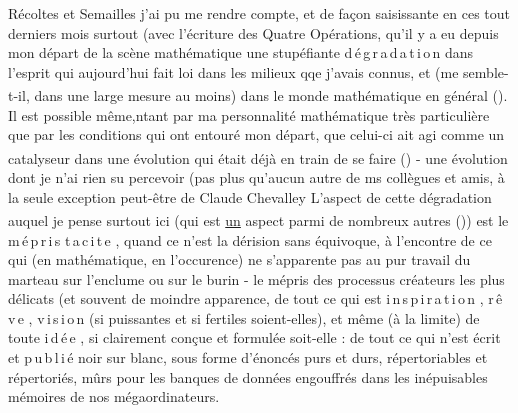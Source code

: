 Récoltes et Semailles j'ai pu me rendre compte, et de façon saisissante en ces tout derniers mois surtout (avec l'écriture des Quatre Opérations\handwritten{)}, qu'il y a eu depuis mon départ de la scène mathématique une stupéfiante \mbox{d\,é\,g\,r\,a\,d\,a\,t\,i\,o\,n} dans l'esprit qui aujourd'hui fait loi dans les milieux qqe j'avais connus, et (me semble-t-il, dans une large mesure au moins) dans le monde mathématique en général (\textsuperscript{}). Il est possible même,ntant par ma personnalité mathématique très particulière que par les conditions qui ont entouré mon départ, que celui-ci ait agi comme un catalyseur dans une évolution qui était déjà en train de se faire (\textsuperscript{}) - une évolution dont je n'ai  rien su percevoir (pas plus qu'aucun autre de ms collègues et amis, à la seule exception peut-être de Claude Chevalley L'aspect de cette dégradation auquel je pense surtout ici (qui  est  \uline{un} aspect parmi de nombreux autres (\textsuperscript{})) est le \mbox{m\,é\,p\,r\,i\,s} \mbox{t\,a\,c\,i\,t\,e} , quand ce n'est la dérision sans équivoque, à l'encontre de ce qui (en mathématique, en l'occurence) ne s'apparente pas au pur travail du marteau sur l'enclume ou sur le burin - le mépris des processus créateurs les plus délicats (et  souvent de moindre apparence\handwritten{)}, de tout ce qui est  \mbox{i\,n\,s\,p\,i\,r\,a\,t\,i\,o\,n} , \mbox{r\,ê\,v\,e} , \mbox{v\,i\,s\,i\,o\,n} (si puissantes et si fertiles soient-elles), et même (à la limite) de toute \mbox{i\,d\,é\,e} , si clairement conçue et formulée soit-elle : de tout ce qui n'est écrit et \mbox{p\,u\,b\,l\,i\,é} noir sur blanc, sous forme d'énoncés purs et durs, répertoriables et répertoriés, mûrs pour les banques de données engouffrés dans les inépuisables mémoires de nos mégaordinateurs.

